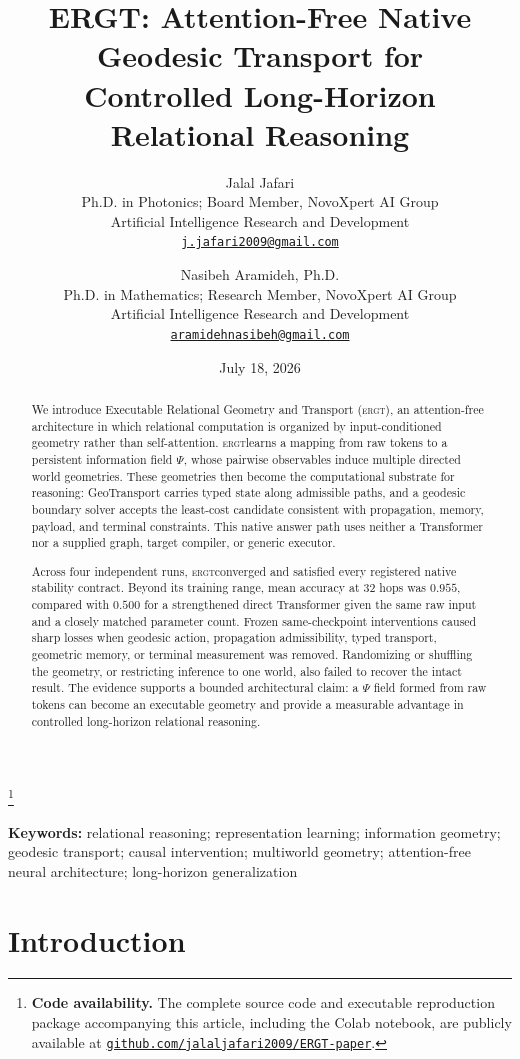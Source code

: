 \documentclass[11pt]{article}
\title{\textbf{ERGT: Attention-Free Native Geodesic Transport for\\
Controlled Long-Horizon Relational Reasoning}}
\author{
Jalal Jafari\\
\small Ph.D. in Photonics; Board Member, NovoXpert AI Group\\
\small Artificial Intelligence Research and Development\\
\small \href{mailto:j.jafari2009@gmail.com}{\texttt{j.jafari2009@gmail.com}}
\and
Nasibeh Aramideh, Ph.D.\\
\small Ph.D. in Mathematics; Research Member, NovoXpert AI Group\\
\small Artificial Intelligence Research and Development\\
\small \href{mailto:aramidehnasibeh@gmail.com}{\texttt{aramidehnasibeh@gmail.com}}
}
\date{July 18, 2026}
\newcommand{\ERGT}{\textsc{ergt}}
\newcommand{\firstpagecodeavailability}[1]{%
  \begingroup
  \renewcommand{\thefootnote}{}\footnote{#1}%
  \addtocounter{footnote}{-1}%
  \endgroup
}
\begin{document}
\maketitle
\firstpagecodeavailability{\textbf{Code availability.} The complete source
code and executable reproduction package accompanying this article, including
the Colab notebook, are publicly available at
\href{https://github.com/jalaljafari2009/ERGT-paper}{\texttt{github.com/jalaljafari2009/ERGT-paper}}.}

\begin{abstract}
We introduce Executable Relational Geometry and Transport (\ERGT), an
attention-free architecture in which relational computation is organized by
input-conditioned geometry rather than self-attention. \ERGT learns a mapping
from raw tokens to a persistent information field $\Psi$, whose pairwise
observables induce multiple directed world geometries. These geometries then
become the computational substrate for reasoning: GeoTransport carries typed
state along admissible paths, and a geodesic boundary solver accepts the
least-cost candidate consistent with propagation, memory, payload, and terminal
constraints. This native answer path uses neither a Transformer nor a supplied
graph, target compiler, or generic executor.

Across four independent runs, \ERGT converged and satisfied every registered
native stability contract. Beyond its training range, mean accuracy at 32 hops
was $0.955$, compared with $0.500$ for a strengthened direct Transformer given
the same raw input and a closely matched parameter count. Frozen
same-checkpoint interventions caused sharp losses when geodesic action,
propagation admissibility, typed transport, geometric memory, or terminal
measurement was removed. Randomizing or shuffling the geometry, or restricting
inference to one world, also failed to recover the intact result. The evidence
supports a bounded architectural claim: a $\Psi$ field formed from raw tokens
can become an executable geometry
and provide a measurable advantage in controlled long-horizon relational
reasoning.
\end{abstract}

\noindent\textbf{Keywords:} relational reasoning; representation learning;
information geometry; geodesic transport; causal intervention; multiworld
geometry; attention-free neural architecture; long-horizon generalization

\section{Introduction}
\end{document}
